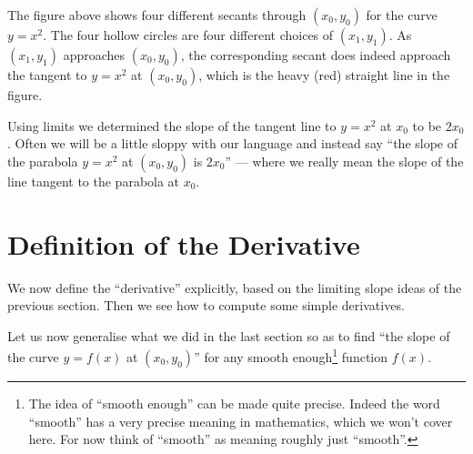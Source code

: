 \begin{eg}
\begin{itemize}
The figure above shows four different secants through $(x_0,y_0)$ for the curve $y=x^2$.
The four hollow circles are four different choices of $(x_1,y_1)$. As $(x_1,y_1)$
approaches $(x_0,y_0)$, the corresponding secant does indeed approach the tangent to
$y=x^2$ at $(x_0,y_0)$, which is the heavy (red) straight line in the figure.

Using limits we determined the slope of the tangent line to $y=x^2$ at $x_0$ to be
$2x_0$. Often we will be a little sloppy with our language and instead say ``the
slope of the parabola $y=x^2$ at $(x_0,y_0)$ is $2x_0$'' --- where we really mean the
slope of the line tangent to the parabola at $x_0$.



\end{itemize}
\end{eg}

\section{Definition of the Derivative} \label{sec def deriv}
We now define the ``derivative'' explicitly, based on the limiting
slope ideas of the previous section. Then we see how to compute some simple
derivatives.

Let us now generalise what we did in the last section so as
to find ``the slope of the curve $y=f(x)$ at $(x_0,y_0)$''
for any smooth enough\footnote{The idea of ``smooth enough'' can be made
quite precise. Indeed the word ``smooth'' has a very precise
meaning in mathematics, which we won't cover here. For now think of
``smooth'' as meaning roughly just ``smooth''.} function $f(x)$.

